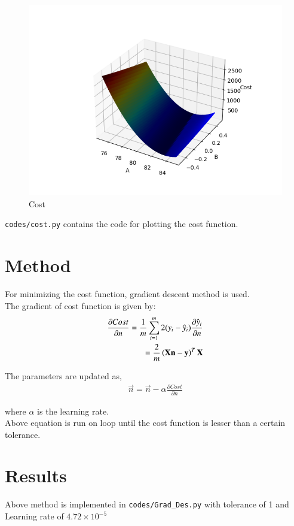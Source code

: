 \documentclass[journal,12pt,twocolumn]{IEEEtran}
\begin{document}
\begin{figure}[h!]
  \centering
   \includegraphics[width=\linewidth]{figs/cost.png}
   \caption{Cost}
   \label{fig:cost}
\end{figure}

\texttt{codes/cost.py} contains the code for plotting the cost function.

\section{Method}

For minimizing the cost function, gradient descent method is used.\\
The gradient of cost function is given by:
\begin{align}
	\frac{\partial{Cost}}{\partial{n}} = \frac{1}{m}\sum_{i=1}^{m} 2(y_i - \hat{y}_i) \frac{\partial{\hat{y}_i}}{\partial{n}}\\
	= \frac{2}{m} \left( \mathbf{X}\mathbf{n} - \mathbf{y} \right)^T \mathbf{X}
\end{align}

The parameters are updated as,
\begin{align}
	\vec{n} = \vec{n} - \alpha \frac{\partial{Cost}}{\partial{n}}
\end{align}

where $\alpha$ is the learning rate.\\
Above equation is run on loop until the cost function is lesser than a certain tolerance.

\section{Results}
	Above method is implemented in \texttt{codes/Grad\_Des.py}
	with tolerance of 1 and Learning rate of $4.72 \times 10^{-5}$\\
	
\end{document}
